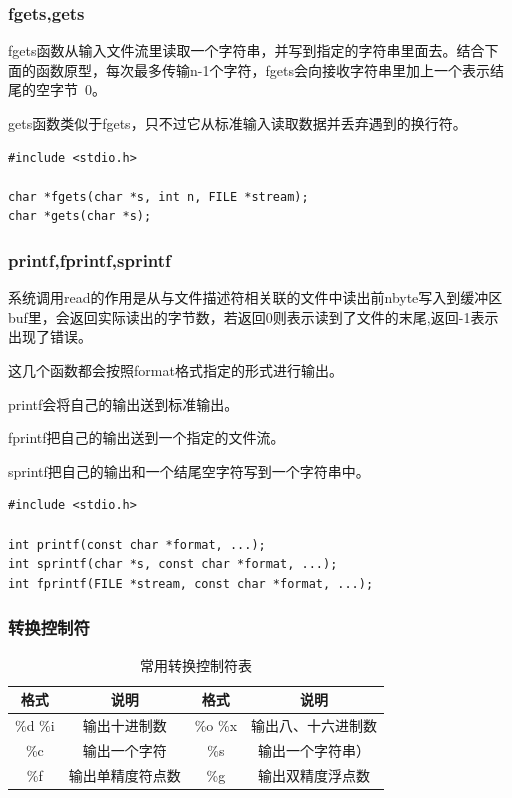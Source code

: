 \documentclass{beamer}
\begin{document}
\begin{frame}[fragile]
\frametitle{fgets,gets}
fgets函数从输入文件流里读取一个字符串，并写到指定的字符串里面去。结合下面的函数原型，每次最多传输n-1个字符，fgets会向接收字符串里加上一个表示结尾的空字节\ 0。

gets函数类似于fgets，只不过它从标准输入读取数据并丢弃遇到的换行符。
\begin{example}
\begin{verbatim}
#include <stdio.h>

char *fgets(char *s, int n, FILE *stream);
char *gets(char *s);
\end{verbatim}
\end{example}

\end{frame}
\begin{frame}[fragile]
\frametitle{printf,fprintf,sprintf}
系统调用read的作用是从与文件描述符相关联的文件中读出前nbyte写入到缓冲区buf里，会返回实际读出的字节数，若返回0则表示读到了文件的末尾,返回-1表示出现了错误。
\begin{example}
这几个函数都会按照format格式指定的形式进行输出。

printf会将自己的输出送到标准输出。

fprintf把自己的输出送到一个指定的文件流。

sprintf把自己的输出和一个结尾空字符写到一个字符串中。
\begin{verbatim}
#include <stdio.h>

int printf(const char *format, ...);
int sprintf(char *s, const char *format, ...);
int fprintf(FILE *stream, const char *format, ...);
\end{verbatim}
\end{example}

\end{frame}
\begin{frame}
\frametitle{转换控制符}
\begin{table}
\begin{tabular}{cccc}
\toprule
\textbf{格式} & \textbf{说明} & \textbf{格式} & \textbf{说明} \\
\midrule
\%d  \%i& 输出十进制数 & \%o \%x & 输出八、十六进制数 \\
\%c & 输出一个字符 & \%s & 输出一个字符串） \\
\%f & 输出单精度符点数 & \%g & 输出双精度浮点数 \\
\bottomrule
\end{tabular}
\caption{常用转换控制符表}
\end{table}
\end{frame}
\end{document}
